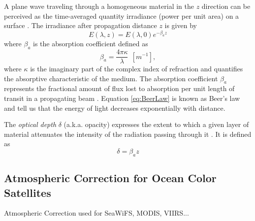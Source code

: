 A plane wave traveling through a homogeneous material in the $z$ direction can be perceived as the time-averaged quantity irradiance   (power per unit area) on a surface \cite{Eismann2012}. The irradiance after propagation distance $z$ is given by
\begin{equation}
  \label{eq:BeerLaw}
  E(\lambda,z) = E(\lambda,0)e^{-\beta_a z}
\end{equation}
where $\beta_a$ is the absorption coefficient   defined as
\begin{equation}
  \beta_a = \frac{4\pi \kappa}{\lambda}~~[m^{-1}],
\end{equation}
where $\kappa$ is the imaginary part of the complex index of refraction and quantifies the absorptive characteristic of the medium. The absorption coefficient $\beta_a$ represents the fractional amount of flux lost to absorption per unit length of transit in a propagating beam \cite{Schott}. Equation \ref{eq:BeerLaw} is known as Beer's law  and tell us that the energy of light decreases exponentially with distance.

The {\it optical depth}   $\delta$ (a.k.a. opacity) expresses the extent to which a given layer of material attenuates the intensity of the radiation passing through it \cite{Rees1990}. It is defined as
\begin{equation}
    \delta = \beta_{a}z
\end{equation}


\subsection{ Atmospheric Correction for Ocean Color Satellites }
Atmospheric Correction used for SeaWiFS, MODIS, VIIRS...

